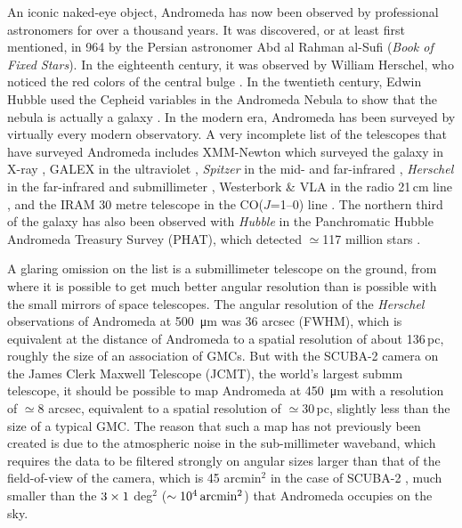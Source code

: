 \documentclass[a4paper,fleqn,usenatbib, twocolumn]{aastex63}
\begin{document}
An iconic naked-eye object, Andromeda has now been observed by professional astronomers for
over a thousand years. It was discovered, or at least first mentioned, in 964 by the Persian
astronomer Abd al Rahman al-Sufi ({\it Book of Fixed Stars}). In the eighteenth 
century, it was observed by William Herschel, who noticed the red colors of the
central bulge \citep{herschel1785}. In the twentieth century, Edwin Hubble used the
Cepheid variables in the Andromeda Nebula to show that the
nebula is actually a galaxy \citep{hubble1929}. In the modern era, Andromeda has been surveyed by virtually every modern observatory. A very incomplete list of the telescopes that have surveyed Andromeda includes XMM-Newton which surveyed the galaxy in X-ray \citep{Stiele2011}, GALEX in the ultraviolet \citep[UV, ][]{Thilker2005}, {\it Spitzer} in the mid- and far-infrared \citep{barmby2005,gordon2006}, {\it Herschel} in the far-infrared and submillimeter \citep{fritz2012,smith2012,draine2014}, Westerbork \& VLA in the radio 21\,cm line  \citep{braun2009, Koch2021}, and the IRAM 30 metre telescope in the CO($J$=1--0) line \citep{Nieten2006}. The northern third of the galaxy has also been observed with {\it Hubble} in the Panchromatic Hubble Andromeda Treasury Survey (PHAT), which
detected $\simeq$117 million stars \citep{dalcanton2012}.

A glaring omission on the list is a submillimeter telescope on the ground,
from where it is possible to get much better angular resolution than is possible with the small mirrors of space telescopes. The angular resolution of the {\it Herschel} observations of Andromeda
at \SI{500}{\micro \meter} was 36 arcsec (FWHM), which is equivalent at the distance of Andromeda
\citep[780\,kpc, ][]{deGrijs2014} to a spatial resolution of about 136\,pc, roughly the size of
an association of GMCs. But with the SCUBA-2 camera on the James Clerk Maxwell Telescope (JCMT), the world's largest submm telescope, it should be possible
to map Andromeda at \SI{450}{\micro\meter} with a resolution of $\simeq$8 arcsec, equivalent
to a spatial resolution of $\simeq$30\,pc, slightly less than the size
of a typical GMC. The reason that such a map has not previously been created is due to the atmospheric
noise in the sub-millimeter waveband, which requires the data to be filtered strongly
on angular sizes larger than that of the field-of-view of the camera, which is 45 arcmin$^2$ in the
case of SCUBA-2 \citep{holland2013}, much smaller than the $\rm 3 \times 1$ deg$^2$ ($\rm \sim10^4\,arcmin^2$) that Andromeda occupies on the sky.
\end{document}

